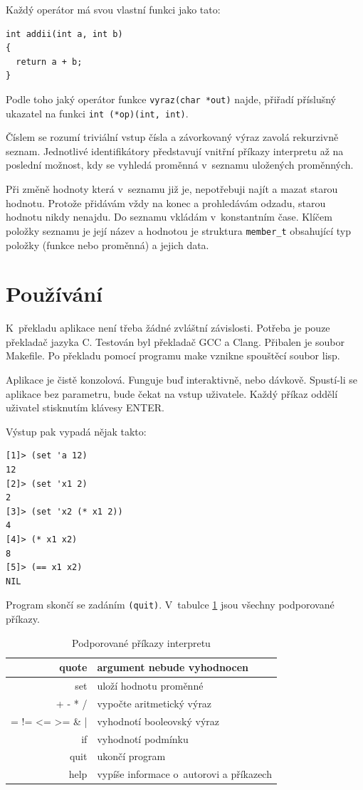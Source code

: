 \documentclass[a4paper, 12pt]{article}
\begin{document}
Každý operátor má svou vlastní funkci jako tato:
\begin{lstlisting}
int addii(int a, int b)
{
  return a + b;
}
\end{lstlisting}

Podle toho jaký operátor funkce \texttt{vyraz(char *out)} najde,
přiřadí příslušný ukazatel na funkci \verb+int (*op)(int, int)+.

Číslem se rozumí triviální vstup čísla a závorkovaný výraz zavolá
rekurzivně seznam. Jednotlivé identifikátory představují
vnitřní příkazy interpretu až na poslední možnost, kdy se vyhledá
proměnná v~seznamu uložených proměnných.

Při změně hodnoty která v~seznamu již je, nepotřebuji najít a mazat
starou hodnotu. Protože přidávám vždy na konec a prohledávám odzadu,
starou hodnotu nikdy nenajdu. Do seznamu vkládám v~konstantním čase.
Klíčem položky seznamu je její název a hodnotou je struktura
\verb+member_t+ obsahující typ položky (funkce nebo proměnná)
a jejich data.

\section{Používání}
K~překladu aplikace není třeba žádné zvláštní závislosti. Potřeba je
pouze překladač jazyka C. Testován byl překladač \textsf{GCC} a \textsf{Clang}.
Přibalen je soubor \textsf{Makefile}. Po překladu pomocí programu
\textsf{make} vznikne spouštěcí soubor \textsf{lisp}.

Aplikace je čistě konzolová. Funguje buď interaktivně, nebo
dávkově. Spustí-li se aplikace bez parametru, bude čekat na vstup
uživatele. Každý příkaz oddělí uživatel stisknutím klávesy ENTER.

Výstup pak vypadá nějak takto:
\begin{verbatim}
[1]> (set 'a 12)
12
[2]> (set 'x1 2)
2
[3]> (set 'x2 (* x1 2))
4
[4]> (* x1 x2)
8
[5]> (== x1 x2)
NIL
\end{verbatim}

Program skončí se zadáním \texttt{(quit)}. V~tabulce \ref{tab:prik}
jsou všechny podporované příkazy.

\begin{table}
\centering
\begin{tabular}{|r|l|}
\hline
quote & argument nebude vyhodnocen\\ \hline
set & uloží hodnotu proměnné\\ \hline
+ - * / & vypočte aritmetický výraz\\ \hline
= != \textless{=} \textgreater{=} \& | & vyhodnotí booleovský výraz\\ \hline
if & vyhodnotí podmínku\\ \hline
quit & ukončí program\\ \hline
help & vypíše informace o~autorovi a příkazech\\
\hline
\end{tabular}
\caption{Podporované příkazy interpretu}
\label{tab:prik}
\end{table}
\end{document}
